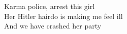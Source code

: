 Karma police, arrest this girl \\
Her Hitler hairdo is making me feel ill \\
And we have crashed her party \\

